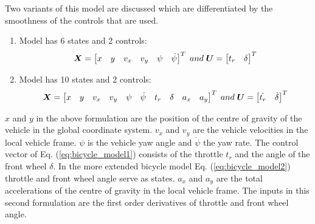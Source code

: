 Two variants of this model are discussed which are differentiated by the smoothness of the controls that are used. 
\begin{enumerate}
	\item	Model has 6 states and 2 controls: 
	\begin{equation}\label{eq:bicycle_model1}
	\centering
	\bm{X} = 
	\begin{bmatrix}
	x & y & v_x & v_y & \psi & \dot{\psi}
	\end{bmatrix}^{T}
	\; and \; \bm{U} = 
	\begin{bmatrix}
	t_r & \delta
	\end{bmatrix}^{T}
	\end{equation}
	
	\item Model has 10 states and 2 controls:
	\begin{equation}\label{eq:bicycle_model2}
	\centering
	\bm{X} = 
	\begin{bmatrix}
	x & y & v_x & v_y & \psi & \dot{\psi} & t_r & \delta & a_x & a_y
	\end{bmatrix}^{T}
	\; and \; \bm{U} = 
	\begin{bmatrix}
	\dot{t_r} & \dot{\delta}
	\end{bmatrix}^{T}
	\end{equation}
\end{enumerate}


$x$ and $y$ in the above formulation are the position of the centre of gravity of the vehicle in the global coordinate system. $v_x$ and $v_y$ are the vehicle velocities in the local vehicle frame. $\psi$ is the vehicle yaw angle and $\dot{\psi}$ the yaw rate.  The control vector of Eq. (\ref{eq:bicycle_model1}) consists of the throttle $t_r$ and the angle of the front wheel $\delta$. In the more extended bicycle model Eq. (\ref{eq:bicycle_model2}) throttle and front wheel angle serve as states. $a_x$ and $a_y$ are the total accelerations of the centre of gravity in the local vehicle frame. The inputs in this second formulation are the first order derivatives of throttle and front wheel angle.\\

